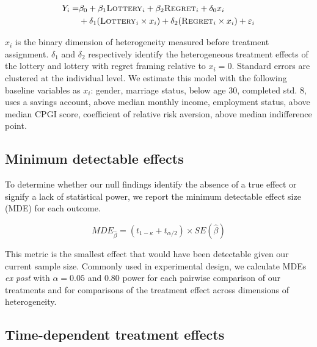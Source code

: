 \documentclass[11pt]{article}
\begin{document}
		\begin{equation} \begin{split}
		Y_{i} = & \beta_{0} + \beta_{1}\text{\textsc{Lottery}}_{i} + \beta_{2}\text{\textsc{Regret}}_{i} + \delta_{0}x_{i} \\
					& + \delta_{1}(\text{\textsc{Lottery}}_{i} \times x_{i}) + \delta_{2}(\text{\textsc{Regret}}_{i} \times x_{i}) + \varepsilon_{i}
		\end{split} \label{eq:heteffect} \end{equation}

		$x_{i}$ is the binary dimension of heterogeneity measured before treatment assignment. $\delta_{1}$ and $\delta_{2}$ respectively identify the heterogeneous treatment effects of the lottery and lottery with regret framing relative to $x_{i} = 0$. Standard errors are clustered at the individual level. We estimate this model with the following baseline variables as $x_{i}$: gender, marriage status, below age 30, completed std. 8, uses a savings account, above median monthly income, employment status, above median CPGI score, coefficient of relative risk aversion, above median indifference point.

	\subsection{Minimum detectable effects}

		To determine whether our null findings identify the absence of a true effect or signify a lack of statistical power, we report the minimum detectable effect size (MDE) for each outcome.

		\begin{equation}
			MDE_{\hat \beta} = (t_{1-\kappa} + t_{\alpha/2}) \times SE(\hat \beta)
		\label{eq:mde} \end{equation}

		This metric is the smallest effect that would have been detectable given our current sample size. Commonly used in experimental design, we calculate MDEs \textit{ex post} with $\alpha = 0.05$ and 0.80 power for each pairwise comparison of our treatments and for comparisons of the treatment effect across dimensions of heterogeneity.


	\subsection{Time-dependent treatment effects}
\end{document}
